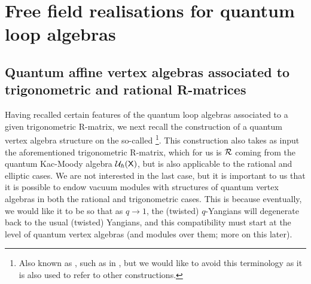 \section{Free field realisations for quantum loop algebras}
    \subsection{Quantum affine vertex algebras associated to trigonometric and rational R-matrices}
        Having recalled certain features of the quantum loop algebras associated to a given trigonometric R-matrix, we next recall the construction of a quantum vertex algebra structure on the so-called \footnote{Also known as , such as in \cite{etingof_kazhdan_quantisation_5}, but we would like to avoid this terminology as it is also used to refer to other constructions.}. This construction also takes as input the aforementioned trigonometric R-matrix, which for us is $\mathcal{R}$ coming from the quantum Kac-Moody algebra $\mathcal{U}_{\hbar}(\mathsf{X})$, but is also applicable to the rational and elliptic cases. We are not interested in the last case, but it is important to us that it is possible to endow vacuum modules with structures of quantum vertex algebras in both the rational and trigonometric cases. This is because eventually, we would like it to be so that as $q \to 1$, the (twisted) $q$-Yangians will degenerate back to the usual (twisted) Yangians, and this compatibility must start at the level of quantum vertex algebras (and modules over them; more on this later).

